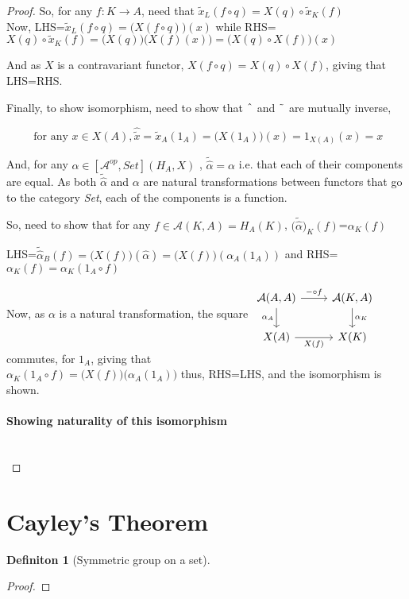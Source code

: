 \documentclass[18pt,a4paper]{article}
\theoremstyle{definition}
\newtheorem{definition}{Definiton}[section]
\begin{document}
\begin{proof}
	So, for any $f:K\to A$, need that $\tilde{x}_L(f \circ q)= X(q) \circ \tilde{x}_K(f)$\\

	Now, LHS=$\tilde{x}_L(f \circ q ) =\Big( X(f \circ q)\Big)(x)$
	while RHS=$X(q) \circ \tilde{x}_K(f) =\Big(X(q)\Big) \big(X(f)(x)\big)
	=\Big(X(q) \circ X(f)\Big) (x) $

	And as $X$ is a contravariant functor, $X(f \circ q)= X(q) \circ X(f)$, giving that LHS=RHS.

	Finally, to show isomorphism, need to show that $\string ^ $ and $\string ~ $ are mutually inverse,

	\[ \text{ for any } x \in X(A),
	\hat{\tilde{x}}=\tilde{x}_A (1_A)=\Big(X(1_A) \Big) (x)=1_{X(A)}(x)=x \]

	And, for any $\alpha \in [\mathcal{A}^{op}, Set](H_A,X)$ , $\tilde{\hat{\alpha}}=\alpha$ i.e. that each of their
	components are equal. As both $\tilde{\hat{\alpha}}$ and $\alpha$ are natural transformations
	between functors that go to the category \textit{Set}, each of the components is a function.

	So, need to show that for any $f \in \mathcal{A} (K,A)=H_A(K)$,
	$\Big(\tilde{\hat{\alpha}}\Big)_K(f)$=$\alpha_K(f)$

	LHS=$\tilde{\hat{\alpha}}_B(f)=\Big(X(f)\Big)(\hat{\alpha})=\Big(X(f)\Big)(\alpha_A(1_A))$
	and RHS=$\alpha_K(f)= \alpha_K(1_A \circ f)$

	Now, as $\alpha$ is a natural transformation, the square
	$\begin{tikzcd}
		\mathcal{A} (A,A) \arrow[swap]{d}{\alpha_A} \arrow{r}{- \circ f}
	& \mathcal{A} (K,A) \arrow{d}{\alpha_K}\\
	X(A) \arrow[swap]{r}{X(f)}
	& X(K)
	\end{tikzcd}$
	commutes, for $1_A$, giving that\\

	$\alpha_K(1_A \circ f)=\Big(X(f) \Big) \big( \alpha_A (1_A) \big)$ thus, RHS=LHS,
	and the isomorphism is shown.

	\paragraph{Showing naturality of this isomorphism }\mbox{} \\



\end{proof}

\section{Cayley's Theorem}%
\begin{definition}[Symmetric group on a set] %

\end{definition}
\begin{proof}

\end{proof}
\end{document}
